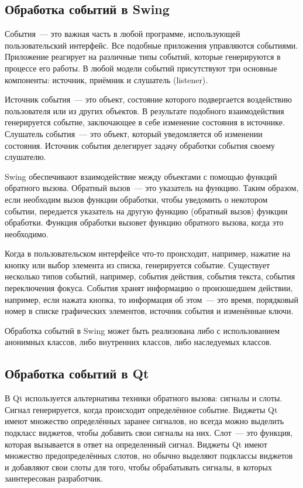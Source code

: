 \subsection{Обработка событий в Swing}

События~--- это важная часть в любой программе, использующей пользовательский интерфейс. Все подобные приложения управляются событиями. Приложение реагирует на различные типы событий, которые генерируются в процессе его работы. В любой модели событий присутствуют три основные компоненты: источник, приёмник и слушатель (listener). 

Источник события~--- это объект, состояние которого подвергается воздействию пользователя или из других объектов. В результате подобного взаимодействия генерируется событие, заключающее в себе изменение состояния в источнике. Слушатель события~--- это объект, который уведомляется об изменении состояния. Источник события делегирует задачу обработки события своему слушателю.

Swing обеспечивают взаимодействие между объектами с помощью функций обратного вызова. Обратный вызов~--- это указатель на функцию. Таким образом, если необходим вызов функции обработки, чтобы уведомить о некотором событии, передается указатель на другую функцию (обратный вызов) функции обработки. Функция обработки вызовет функцию обратного вызова, когда это необходимо.

Когда в пользовательском интерфейсе что-то происходит, например, нажатие на кнопку или выбор элемента из списка, генерируется событие. Существует несколько типов событий, например, события действия, события текста, события переключения фокуса. События хранят информацию о произошедшем действии, например, если нажата кнопка, то информация об этом~--- это время, порядковый номер в списке графических элементов, источник события и изменённые ключи.

Обработка событий в Swing может быть реализована либо с использованием анонимных классов, либо внутренних классов, либо наследуемых классов.


\subsection{Обработка событий в Qt}

В Qt используется альтернатива техники обратного вызова: сигналы и слоты. Сигнал генерируется, когда происходит определённое событие. Виджеты Qt имеют множество определённых заранее сигналов, но всегда можно выделить подкласс виджетов, чтобы добавить свои сигналы на них. Слот~--- это функция, которая вызывается в ответ на определенный сигнал. Виджеты Qt имеют множество предопределённых слотов, но обычно выделяют подклассы виджетов и добавляют свои слоты для того, чтобы обрабатывать сигналы, в которых заинтересован разработчик.


